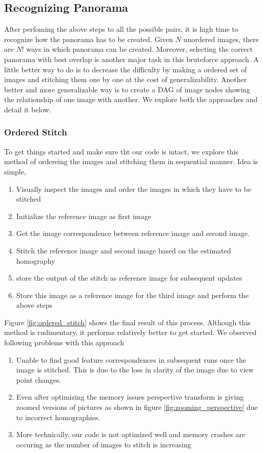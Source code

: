 \documentclass[conference]{IEEEtran}
\begin{document}
\subsection{Recognizing Panorama}
After perfoming the above steps to all the possible pairs, it is high time to recognize how the panorama has to be created. Given $N$ unordered images, there are $N!$ ways in which panorama can be created. Moreover, selecting the correct panorama with best overlap is another major task in this 
 bruteforce approach. A little better way to do is to decrease the difficulty by making a ordered set of images and stitching them one by one at the cost of generalizability. Another better and more generalizable way is to create a DAG of image nodes showing the relationship of one image with another. We explore both the approaches and detail it below. 

 \subsubsection{Ordered Stitch}
 To get things started and make sure tht our code is intact, we explore this method of ordereing the images and stitching them in sequential manner. Idea is simple, 
 \begin{enumerate}
 \item Visually inspect the images and order the images in which they have to be stitched
 \item Initialize the reference image as first image
 \item Get the image correspondence between reference image and second image.
 \item Stitch the reference image and second image based on the estimated homography
 \item store the output of the stitch as reference image for subsequent updates
 \item Store this image as a reference image for the third image and perform the above steps
 \end{enumerate}

 Figure \ref{fig:ordered_stitch} shows the final result of this process. Although this method is rudimentary, it performs relatively better to get started. We observed following problems with this approach 
 \begin{enumerate}
     \item Unable to find good feature correspondences in subsequent runs once the image is stitched. This is due to the loss in clarity of the image due to view point changes. 
     \item Even after optimizing the memory issues perspective transform is giving zoomed versions of pictures as shown in figure \ref{fig:zooming_perspective} due to incorrect homographies. 
     \item More technically, our code is not optimized well and memory crashes are occuring as the number of images to stitch is increasing
 \end{enumerate}
\end{document}
